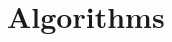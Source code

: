 \documentclass{article}
\theoremstyle{plain}
\theoremstyle{definition}
\theoremstyle{remark}
\begin{document}
    





\section{Algorithms}\label{sect:pseudocode}
\end{document}
